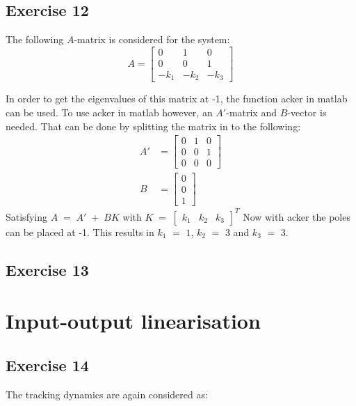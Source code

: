\subsection{Exercise 12}
The following $A$-matrix is considered for the system:
\begin{equation}
    A = \begin{bmatrix}
    0 & 1 & 0 \\
    0 & 0 & 1 \\
    -k_1 & -k_2 & -k_3
    \end{bmatrix}
    \label{eq:ex12_A}
\end{equation}

In order to get the eigenvalues of this matrix at -1, the function acker in matlab can be used. To use acker in matlab however, an $A'$-matrix and $B$-vector is needed. That can be done by splitting the matrix in to the following:
\begin{align}

    A' &= \begin{bmatrix}
    0 & 1 & 0\\
    0 & 0 & 1 \\
    0 & 0 & 0
    \end{bmatrix} \\
    B &= \begin{bmatrix}
    0 \\ 0 \\ 1
    \end{bmatrix}
\end{align}
Satisfying $A\;=\;A'\;+\;BK$ with $K \;= \; \begin{bmatrix} k_1 & k_2 & k_3 \end{bmatrix} ^T $
Now with acker the poles can be placed at -1. This results in $k_1$ $=$ $1$, $k_2$ $=$ $3$ and $k_3$ $=$ $3$. 


\subsection{Exercise 13}


\section{Input-output linearisation}

\subsection{Exercise 14}

The tracking dynamics are again considered as:

